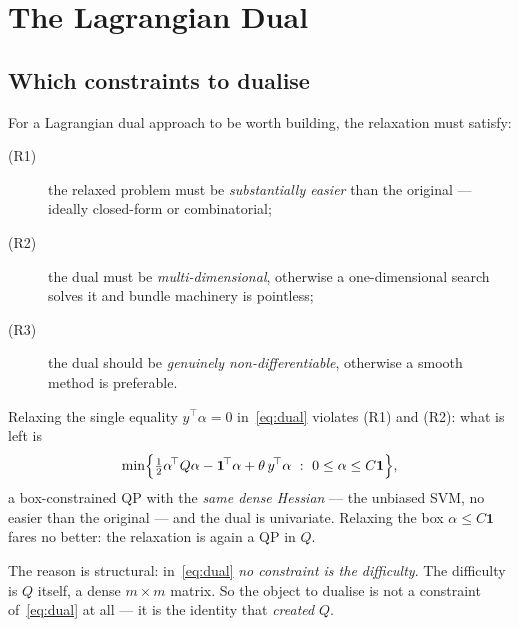 \documentclass[11pt,a4paper]{report}
\newcommand{\one}{\mathbf{1}}
\begin{document}
\chapter{The Lagrangian Dual}
\label{ch:dual}

\section{Which constraints to dualise}
\label{sec:choice}
For a Lagrangian dual approach to be worth building, the relaxation must satisfy:
\begin{description}
\item[(R1)] the relaxed problem must be \emph{substantially easier} than the
  original --- ideally closed-form or combinatorial;
\item[(R2)] the dual must be \emph{multi-dimensional}, otherwise a one-dimensional
  search solves it and bundle machinery is pointless;
\item[(R3)] the dual should be \emph{genuinely non-differentiable}, otherwise a
  smooth method is preferable.
\end{description}

Relaxing the single equality $y^{\!\top}\alpha=0$ in~\eqref{eq:dual} violates (R1)
and (R2): what is left is
\[
\min\Bigl\{\tfrac12\alpha^{\!\top}Q\alpha-\one^{\!\top}\alpha+\theta\,y^{\!\top}\alpha
\ :\ 0\le\alpha\le C\one\Bigr\},
\]
a box-constrained QP with the \emph{same dense Hessian} --- the unbiased SVM, no
easier than the original --- and the dual is univariate. Relaxing the box
$\alpha\le C\one$ fares no better: the relaxation is again a QP in $Q$.

The reason is structural: in~\eqref{eq:dual} \emph{no constraint is the difficulty}.
The difficulty is $Q$ itself, a dense $m\times m$ matrix. So the object to dualise is
not a constraint of~\eqref{eq:dual} at all --- it is the identity that \emph{created}
$Q$.
\end{document}
